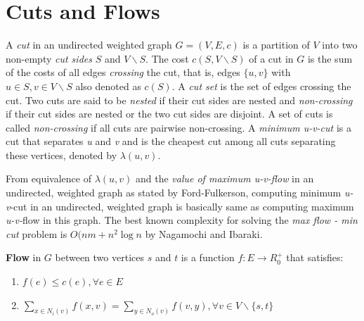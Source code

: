     \section{Cuts and Flows}
    A \textit{cut} in an undirected weighted graph $G = (V,E,c)$ is a partition of $V$ into two non-empty \textit{cut sides} $S$ and $V \backslash S$. The cost $c(S,V \backslash S)$ of a cut in $G$ is the sum of the costs of all edges \textit{crossing} the cut, that is, edges $\{u,v\}$ with $u \in S, v \in V\backslash S$ also denoted as $c(S)$. A \textit{cut set} is the set of edges crossing the cut. Two cuts are said to be \textit{nested} if their cut sides are nested and \textit{non-crossing} if their cut sides are nested or the two cut sides are disjoint. A set of cuts is called \textit{non-crossing} if all cuts are pairwise non-crossing. A \textit{minimum u-v-cut} is a cut that separates \textit{u} and \textit{v} and is the cheapest cut among all cuts separating these vertices, denoted by $\lambda (u,v)$.

    
    From equivalence of $\lambda (u,v)$ and the \textit{value of maximum u-v-flow} in an undirected, weighted graph as stated by Ford-Fulkerson, computing minimum \textit{u-v}-cut in an undirected, weighted graph is basically same as computing maximum \textit{u-v-}flow in this graph. The best known complexity for solving the \textit{max flow - min cut} problem is $O(nm + n^2\log n$ by Nagamochi and Ibaraki.

    \textbf{Flow} in $G$ between two vertices $s$ and $t$ is a function $f:E\xrightarrow{}R_0^{+}$ that satisfies:
    \begin{enumerate}
        \item {$f(e) \le c(e), \forall e\in E$}
        \item {$\sum_{x\in N_i(v)}f(x,v) = \sum_{y\in N_o(v)}f(v,y), \forall v \in V\backslash \{s,t\}$}
    \end{enumerate}